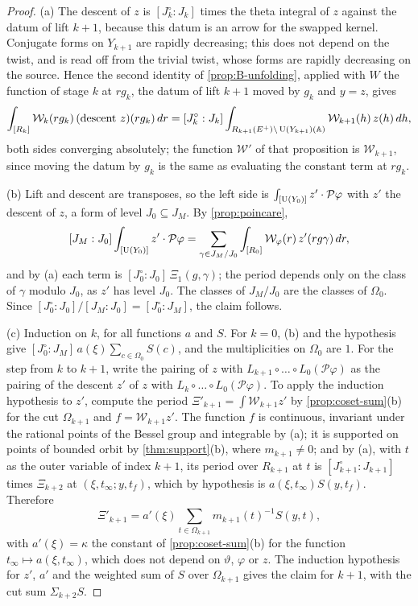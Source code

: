 \begin{proof}
(a) The descent of $z$ is $[J^\circ_k:J_k]$ times the theta integral of $z$ against the datum of lift $k+1$, because this datum is an arrow for the swapped kernel. Conjugate forms on $Y_{k+1}$ are rapidly decreasing; this does not depend on the twist, and is read off from the trivial twist, whose forms are rapidly decreasing on the source. Hence the second
identity of \cref{prop:B-unfolding}, applied with $W$ the function of stage $k$ at $rg_k$, the datum of lift $k+1$ moved by $g_k$ and $y=z$, gives
\[
  \int_{[R_k]}\mathcal W_k(rg_k)\,(\text{descent }z)(rg_k)\,dr=[J^\circ_k:J_k]\int_{R_{k+1}(E^+)\backslash\operatorname{U}(Y_{k+1})(\mathbb{A})}\mathcal W_{k+1}(h)\,z(h)\,dh ,
\]
both sides converging absolutely; the function $\mathcal W'$ of that proposition is $\mathcal W_{k+1}$, since moving the datum by $g_k$ is the same as evaluating the constant term at $rg_k$.

(b) Lift and descent are transposes, so the left side is $\int_{[\operatorname{U}(Y_0)]}z'\cdot\mathcal P\varphi$ with $z'$ the descent of $z$, a form of level $J_0\subseteq J_M$. By \cref{prop:poincare},
\[
  [J_M:J_0]\int_{[\operatorname{U}(Y_0)]}z'\cdot\mathcal P\varphi=\sum_{\gamma\in J_M/J_0}\int_{[R_0]}\mathcal W_\varphi(r)\,z'(rg\gamma)\,dr ,
\]
and by (a) each term is $[J^\circ_0:J_0]\,\Xi_1(g,\gamma)$; the period depends only on the class of $\gamma$ modulo $J_0$, as $z'$ has level $J_0$. The classes of $J_M/J_0$ are the classes of $\Omega_0$. Since $[J^\circ_0:J_0]/[J_M:J_0]=[J^\circ_0:J_M]$, the claim follows.

(c) Induction on $k$, for all functions $a$ and $S$. For $k=0$, (b) and the hypothesis give $[J^\circ_0:J_M]\,a(\xi)\sum_{c\in\Omega_0}S(c)$, and the multiplicities on $\Omega_0$ are $1$. For the step from $k$ to $k+1$, write the pairing of $z$ with $L_{k+1}\circ\dots\circ L_0(\mathcal P\varphi)$ as the pairing of the descent $z'$ of $z$ with
$L_k\circ\dots\circ L_0(\mathcal P\varphi)$. To apply the induction hypothesis to $z'$, compute the period $\Xi'_{k+1}=\int\mathcal W_{k+1}z'$ by \cref{prop:coset-sum}(b) for the cut $\Omega_{k+1}$ and $f=\mathcal W_{k+1}z'$. The function $f$ is continuous, invariant under the rational points of the Bessel group and integrable by (a); it is supported on
points of bounded orbit by \cref{thm:support}(b), where $m_{k+1}\ne0$; and by (a), with $t$ as the outer variable of index $k+1$, its period over $R_{k+1}$ at $t$ is $[J^\circ_{k+1}:J_{k+1}]$ times $\Xi_{k+2}$ at $(\xi,t_\infty;y,t_f)$, which by hypothesis is $a(\xi,t_\infty)S(y,t_f)$. Therefore
\[
  \Xi'_{k+1}=a'(\xi)\sum_{t\in\Omega_{k+1}}m_{k+1}(t)^{-1}S(y,t),
\]
with $a'(\xi)=\kappa$ the constant of \cref{prop:coset-sum}(b) for the function $t_\infty\mapsto a(\xi,t_\infty)$, which does not depend on $\vartheta$, $\varphi$ or $z$. The induction hypothesis for $z'$, $a'$ and the weighted sum of $S$ over $\Omega_{k+1}$ gives the claim for $k+1$, with the cut sum $\Sigma_{k+2}S$.


\end{proof}
